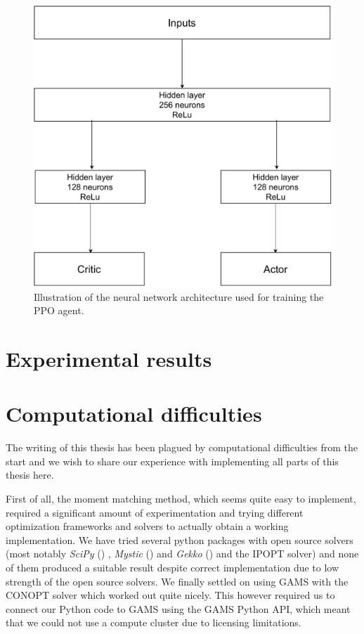 \begin{figure}[H]
  \centering
  \includegraphics[width=\linewidth / 2]{../img/nn_diagram.pdf}
  \caption{Illustration of the neural network architecture used for training the PPO agent.}
  \label{fig:neuralnet}
\end{figure}

\section{Experimental results}
\label{section:experimental_results}


\newpage
\section{Computational difficulties}
\label{section:computational_difficulties}
The writing of this thesis has been plagued by computational difficulties from the start and we wish to share our experience with implementing all parts of this thesis here. 

First of all, the moment matching method, which seems quite easy to implement, required a significant amount of experimentation and trying different optimization frameworks and solvers to actually obtain a working implementation. We have tried several python packages with open source solvers (most notably \textit{SciPy} (\cite{scipy}) , \textit{Mystic} (\cite{mystic}) and \textit{Gekko} (\cite{gekko}) and the IPOPT solver) and none of them produced a suitable result despite correct implementation due to low strength of the open source solvers. We finally settled on using GAMS with the CONOPT solver which worked out quite nicely. This however required us to connect our Python code to GAMS using the GAMS Python API, which meant that we could not use a compute cluster due to licensing limitations. 

